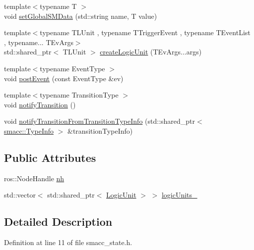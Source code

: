 \begin{DoxyCompactItemize}
\item 
{\footnotesize template$<$typename T $>$ }\\void \hyperlink{classsmacc_1_1ISmaccState_a120fcda41b44a437ff2e3906ac9fa5ca}{set\+Global\+S\+M\+Data} (std\+::string name, T value)
\item 
{\footnotesize template$<$typename T\+L\+Unit , typename T\+Trigger\+Event , typename T\+Event\+List , typename... T\+Ev\+Args$>$ }\\std\+::shared\+\_\+ptr$<$ T\+L\+Unit $>$ \hyperlink{classsmacc_1_1ISmaccState_a0a0a7d4b6d35bd9008448c6f63713fb2}{create\+Logic\+Unit} (T\+Ev\+Args...\+args)
\item 
{\footnotesize template$<$typename Event\+Type $>$ }\\void \hyperlink{classsmacc_1_1ISmaccState_acef404ab3766ddf2892e8dad14a4a7cf}{post\+Event} (const Event\+Type \&ev)
\item 
{\footnotesize template$<$typename Transition\+Type $>$ }\\void \hyperlink{classsmacc_1_1ISmaccState_a98df316afd79180d3c27a15a7d5dd1cf}{notify\+Transition} ()
\item 
void \hyperlink{classsmacc_1_1ISmaccState_a46ec42e07b8c68e8ddb7dd3472e91214}{notify\+Transition\+From\+Transition\+Type\+Info} (std\+::shared\+\_\+ptr$<$ \hyperlink{classsmacc_1_1TypeInfo}{smacc\+::\+Type\+Info} $>$ \&transition\+Type\+Info)
\end{DoxyCompactItemize}
\subsection*{Public Attributes}
\begin{DoxyCompactItemize}
\item 
ros\+::\+Node\+Handle \hyperlink{classsmacc_1_1ISmaccState_a13fe6e6abfdb87996402189d44b78494}{nh}
\item 
std\+::vector$<$ std\+::shared\+\_\+ptr$<$ \hyperlink{classsmacc_1_1LogicUnit}{Logic\+Unit} $>$ $>$ \hyperlink{classsmacc_1_1ISmaccState_a21bb2f9adba9c86e3d5306fd1db99fcd}{logic\+Units\+\_\+}
\end{DoxyCompactItemize}


\subsection{Detailed Description}


Definition at line 11 of file smacc\+\_\+state.\+h.



